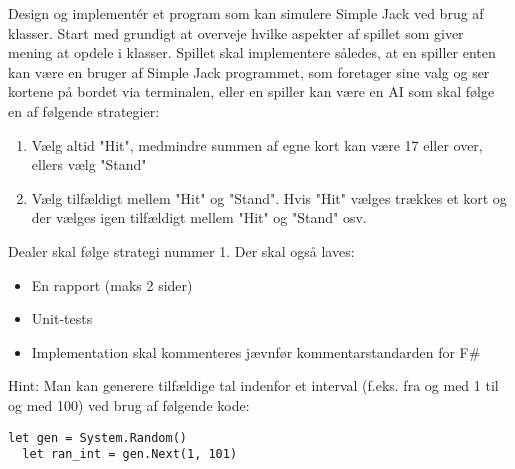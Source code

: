 Design og implement\'{e}r et program som kan simulere Simple Jack ved brug af klasser.  Start med grundigt at overveje hvilke aspekter af spillet som giver mening at opdele i klasser. Spillet skal implementere således, at en spiller enten kan være en bruger af Simple Jack programmet, som foretager sine valg og ser kortene på bordet via terminalen, eller en spiller kan være en AI som skal følge en af følgende strategier:
\begin{enumerate}
\item Vælg altid "Hit", medmindre summen af egne kort kan være 17 eller over, ellers vælg "Stand"
\item Vælg tilfældigt mellem "Hit" og "Stand". Hvis "Hit" vælges trækkes et kort og der vælges igen tilfældigt mellem "Hit" og "Stand" osv.
\end{enumerate}
Dealer skal følge strategi nummer 1.  Der skal også laves:
\begin{itemize}
\item En rapport (maks 2 sider)
\item Unit-tests
\item Implementation skal kommenteres jævnfør kommentarstandarden for F\#
\end{itemize}
Hint: Man kan generere tilfældige tal indenfor et interval (f.eks. fra og med 1 til og med 100) ved brug af følgende kode:
\begin{lstlisting}[frame=none]
  let gen = System.Random()
  let ran_int = gen.Next(1, 101)
\end{lstlisting}
